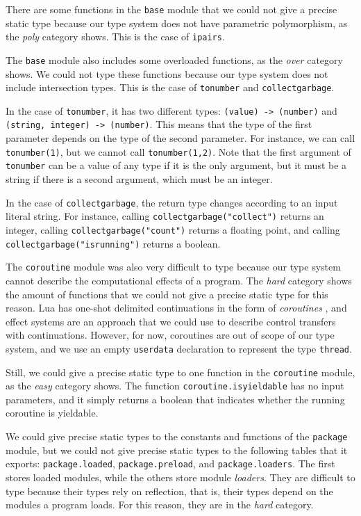 There are some functions in the \texttt{base} module that
we could not give a precise static type because our type
system does not have parametric polymorphism,
as the \emph{poly} category shows.
This is the case of \texttt{ipairs}.

The \texttt{base} module also includes some overloaded functions,
as the \emph{over} category shows.
We could not type these functions because our type system does
not include intersection types.
This is the case of \texttt{tonumber} and \texttt{collectgarbage}.

In the case of \texttt{tonumber}, it has two different types:
\texttt{(value) -> (number)} and \texttt{(string, integer) -> (number)}.
This means that the type of the first parameter depends on the
type of the second parameter.
For instance, we can call \texttt{tonumber(1)}, but we cannot
call \texttt{tonumber(1,2)}.
Note that the first argument of \texttt{tonumber} can be
a value of any type if it is the only argument, but it must
be a string if there is a second argument,
which must be an integer.

In the case of \texttt{collectgarbage}, the return type changes
according to an input literal string.
For instance, calling \texttt{collectgarbage("collect")} returns an integer,
calling \texttt{collectgarbage("count")} returns a floating point,
and calling \texttt{collectgarbage("isrunning")} returns a boolean.

The \texttt{coroutine} module was also very difficult to type
because our type system cannot describe the computational effects
of a program.
The \emph{hard} category shows the amount of functions that we
could not give a precise static type for this reason.
Lua has one-shot delimited continuations \cite{james2011yield}
in the form of \emph{coroutines} \cite{moura2009rc}, and
effect systems \cite{nielson1999type} are an approach that we
could use to describe control transfers with continuations.
However, for now, coroutines are out of scope of our type
system, and we use an empty \texttt{userdata} declaration
to represent the type \texttt{thread}.

Still, we could give a precise static type to one function in
the \texttt{coroutine} module, as the \emph{easy} category shows.
The function \texttt{coroutine.isyieldable} has no input parameters,
and it simply returns a boolean that indicates whether the running
coroutine is yieldable.

We could give precise static types to the constants and functions
of the \texttt{package} module, but we could not give precise static
types to the following tables that it exports:
\texttt{package.loaded}, \texttt{package.preload}, and \texttt{package.loaders}.
The first stores loaded modules, while the others store module \emph{loaders}.
They are difficult to type because their types rely on reflection,
that is, their types depend on the modules a program loads.
For this reason, they are in the \emph{hard} category.

